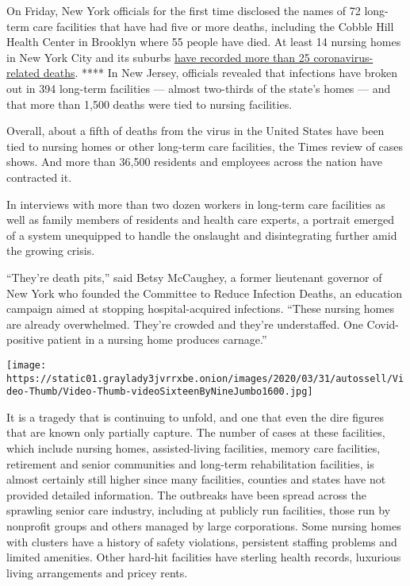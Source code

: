 On Friday, New York officials for the first time disclosed the names of
72 long-term care facilities that have had five or more deaths,
including the Cobble Hill Health Center in Brooklyn where 55 people have
died. At least 14 nursing homes in New York City and its suburbs
\href{https://www.nytimes3xbfgragh.onion/2020/04/17/nyregion/new-york-nursing-homes-coronavirus-deaths.html}{have
recorded more than 25 coronavirus-related deaths}. **** In New Jersey,
officials revealed that infections have broken out in 394 long-term
facilities --- almost two-thirds of the state's homes --- and that more
than 1,500 deaths were tied to nursing facilities.

Overall, about a fifth of deaths from the virus in the United States
have been tied to nursing homes or other long-term care facilities, the
Times review of cases shows. And more than 36,500 residents and
employees across the nation have contracted it.

In interviews with more than two dozen workers in long-term care
facilities as well as family members of residents and health care
experts, a portrait emerged of a system unequipped to handle the
onslaught and disintegrating further amid the growing crisis.

``They're death pits,'' said Betsy McCaughey, a former lieutenant
governor of New York who founded the Committee to Reduce Infection
Deaths, an education campaign aimed at stopping hospital-acquired
infections. ``These nursing homes are already overwhelmed. They're
crowded and they're understaffed. One Covid-positive patient in a
nursing home produces carnage.''

\texttt{[image: https://static01.graylady3jvrrxbe.onion/images/2020/03/31/autossell/Video-Thumb/Video-Thumb-videoSixteenByNineJumbo1600.jpg]}

It is a tragedy that is continuing to unfold, and one that even the dire
figures that are known only partially capture. The number of cases at
these facilities, which include nursing homes, assisted-living
facilities, memory care facilities, retirement and senior communities
and long-term rehabilitation facilities, is almost certainly still
higher since many facilities, counties and states have not provided
detailed information. The outbreaks have been spread across the
sprawling senior care industry, including at publicly run facilities,
those run by nonprofit groups and others managed by large corporations.
Some nursing homes with clusters have a history of safety violations,
persistent staffing problems and limited amenities. Other hard-hit
facilities have sterling health records, luxurious living arrangements
and pricey rents.

